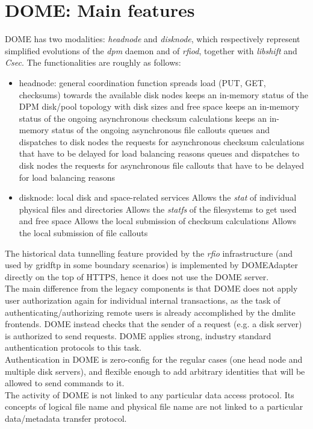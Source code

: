 \documentclass[a4paper]{jpconf}
\begin{document}
\section{DOME: Main features}
DOME has two modalities: \textit{headnode} and \textit{disknode}, which respectively represent
simplified evolutions of the \textit{dpm} daemon and of \textit{rfiod}, together with \textit{libshift} and \textit{Csec}.
The functionalities are roughly as follows:
\begin{itemize}
 \item headnode: general coordination function
 \subitem spreads load (PUT, GET, checksums) towards the available disk nodes
 \subitem keeps an in-memory status of the DPM disk/pool topology with disk sizes and free space
 \subitem keeps an in-memory status of the ongoing asynchronous checksum calculations
 \subitem keeps an in-memory status of the ongoing asynchronous file callouts
 \subitem queues and dispatches to disk nodes the requests for asynchronous checksum calculations that have to be delayed for load balancing reasons
 \subitem queues and dispatches to disk nodes the requests for asynchronous file callouts that have to be delayed for load balancing reasons

 \item disknode: local disk and space-related services
 \subitem Allows the \textit{stat} of individual physical files and directories
 \subitem Allows the \textit{statfs} of the filesystems to get used and free space
 \subitem Allows the local submission of checksum calculations
 \subitem Allows the local submission of file callouts
\end{itemize}

The historical data tunnelling feature provided by the \textit{rfio} infrastructure (and used by gridftp in some boundary scenarios) \cite{rfio}
is implemented by DOMEAdapter directly on the top of HTTPS, hence it does not use the DOME server.\\

The main difference from the legacy components is that DOME does not apply user authorization again for individual internal
transactions, as the task of authenticating/authorizing remote users is already accomplished by the dmlite frontends.
DOME instead checks that the sender of a request (e.g. a disk server) is authorized to
send requests. DOME applies strong, industry standard authentication protocols to this task.\\
Authentication in DOME is zero-config for the regular cases (one head node and multiple disk servers), and flexible enough
to add arbitrary identities that will be allowed to send commands to it.\\
The activity of DOME is not linked to any particular data access protocol. Its concepts of logical file name and physical file name are not linked to a particular data/metadata transfer protocol.
\end{document}
